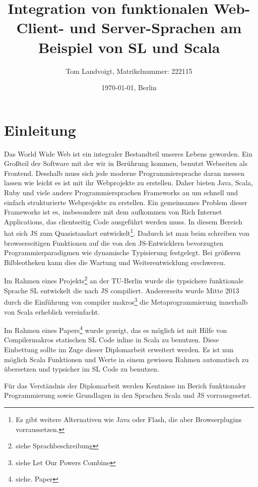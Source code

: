 \documentclass[12pt]{scrreprt}
\title{Integration von funktionalen Web-Client- und Server-Sprachen am Beispiel von SL und Scala}
\author{Tom Landvoigt, Matrikelnummer: 222115}
\date{\today{}, Berlin}
\begin{document}
\maketitle
\tableofcontents

\newpage

\lstset{basicstyle=\ttfamily\small, numbers=left, numberstyle=\tiny}

\section{Einleitung}

Das World Wide Web ist ein integraler Bestandteil unseres Lebens geworden. Ein Großteil der Software mit der wir in Berührung kommen, benutzt Webseiten als Frontend. Desshalb muss sich jede moderne Programmiersprache daran messen lassen wie leicht es ist mit ihr Webprojekte zu erstellen. Daher bieten Java, Scala, Ruby und viele andere Programmiersprachen Frameworks an um schnell und einfach strukturierte Webprojekte zu erstellen. Ein gemeinsames Problem dieser Frameworks ist es, insbesondere mit dem aufkommen von Rich Internet Applications, das clientseitig Code ausgeführt werden muss. In diesem Bereich hat sich \ac{JS} zum Quasistandart entwickelt\footnote{Es gibt weitere Alternativen wie Java oder Flash, die aber Browserplugins vorraussetzen.}. Dadurch ist man beim schreiben von browserseitigen Funktionen auf die von den \ac{JS}-Entwicklern bevorzugten Programmierparadigmen wie dynamische Typisierung festgelegt. Bei größeren Bilbleotheken kann dies die Wartung und Weiterentwicklung erschweren.

Im Rahmen eines Projekts\footnote{siehe Sprachbeschreibung} an der TU-Berlin wurde die typsichere funktionale Sprache \ac{SL} entwickelt die nach \ac{JS} compiliert. Andererseits wurde Mitte 2013 durch die Einführung von compiler makros\footnote{siehe Let Our Powers Combine} die Metaprogrammierung innerhalb von Scala erheblich vereinfacht.

Im Rahmen eines Papers\footnote{siehe. Paper} wurde gezeigt, das es möglich ist mit Hilfe von Compilermakros statischen \ac{SL} Code inline in Scala zu benutzen. Diese Einbettung sollte im Zuge dieser Diplomarbeit erweitert werden. Es ist nun möglich Scala Funktionen und Werte in einem gewissen Rahmen automatisch zu übersetzen und typsicher im \ac{SL} Code zu benutzen.

Für das Verständnis der Diplomarbeit werden Kentnisse im Berich funktionaler Programmierung sowie Grundlagen in den Sprachen Scala und \ac{JS} vorrausgesetzt.
\end{document}
